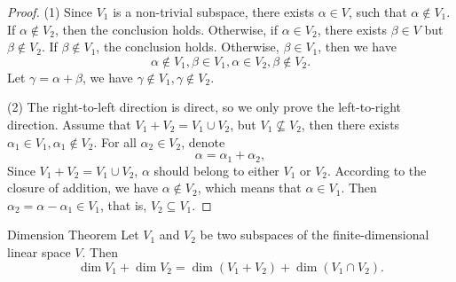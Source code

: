 \begin{proof}
  (1) Since $V_1$ is a non-trivial subspace, there exists $\alpha \in V$,
  such that $\alpha \not\in V_1$. If $\alpha \not \in V_2$, then the conclusion
  holds.
  Otherwise, if $\alpha \in V_2$, there exists $\beta \in V$ but
  $\beta \not\in V_2$.
  If $\beta \not \in V_1$, the conclusion holds. Otherwise, $\beta \in V_1$,
  then we have
  \begin{equation}
    \alpha \not\in V_1, \beta \in V_1, \alpha \in V_2, \beta \not \in V_2.
  \end{equation}
  Let $\gamma = \alpha + \beta$, we have $\gamma \not \in V_1, \gamma \not \in V_2$.

  (2) The right-to-left direction is direct, so we only prove the left-to-right direction.
  Assume that $V_1 + V_2 = V_1 \cup V_2$, but $V_1 \not\subseteq V_2$,
  then there exists $\alpha_1 \in V_1, \alpha_1 \not \in V_2$.
  For all $\alpha_2 \in V_2$, denote
  \begin{equation}
    \alpha = \alpha_1 + \alpha_2,
  \end{equation}
  Since $V_1 + V_2 = V_1 \cup V_2$,
  $\alpha$ should belong to either $V_1$ or $V_2$.
  According to the closure of addition, we have $\alpha \not \in V_2$,
  which means that $\alpha \in V_1$.
  Then $\alpha_2 = \alpha - \alpha_1 \in V_1$, that is,
  $V_2 \subseteq V_1$.
\end{proof}

\begin{theorem}{Dimension Theorem}{}
  Let $V_1$ and $V_2$ be two subspaces of the finite-dimensional linear space
  $V$. Then
  \begin{equation}
    \dim V_1 + \dim V_2 = \dim (V_1 + V_2) + \dim (V_1 \cap V_2).
  \end{equation}
\end{theorem}

